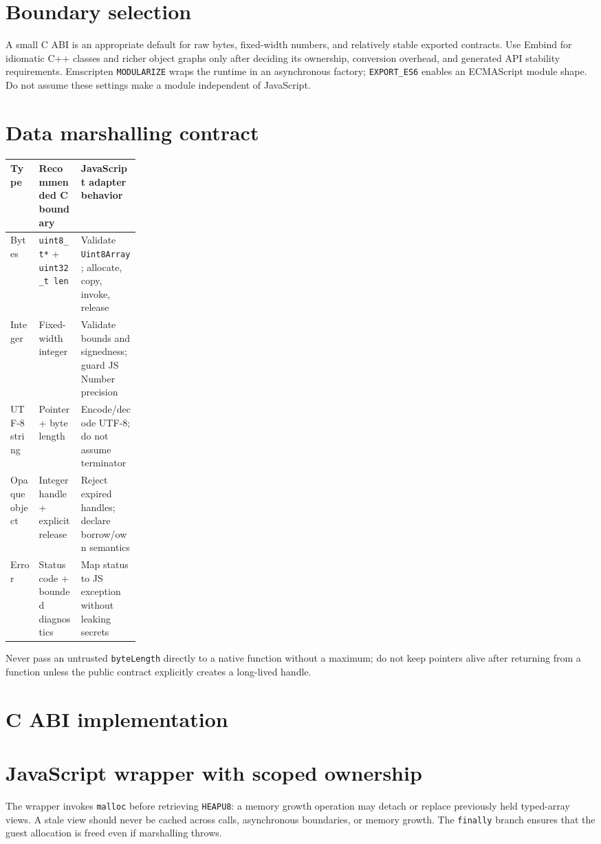 \documentclass[11pt,letterpaper]{article}
\begin{document}
\frontmatterdoc
\section{Boundary selection}
A small C ABI is an appropriate default for raw bytes, fixed-width numbers, and relatively stable exported contracts. Use Embind for idiomatic C++ classes and richer object graphs only after deciding its ownership, conversion overhead, and generated API stability requirements. Emscripten \texttt{MODULARIZE} wraps the runtime in an asynchronous factory; \texttt{EXPORT\_ES6} enables an ECMAScript module shape. Do not assume these settings make a module independent of JavaScript.

\section{Data marshalling contract}
\noindent\begin{tabularx}{\linewidth}{p{0.22\linewidth}X X}
\toprule Type & Recommended C boundary & JavaScript adapter behavior \\ \midrule
Bytes & \texttt{uint8\_t*} + \texttt{uint32\_t len} & Validate \texttt{Uint8Array}; allocate, copy, invoke, release \\
Integer & Fixed-width integer & Validate bounds and signedness; guard JS Number precision \\
UTF-8 string & Pointer + byte length & Encode/decode UTF-8; do not assume terminator \\
Opaque object & Integer handle + explicit release & Reject expired handles; declare borrow/own semantics \\
Error & Status code + bounded diagnostics & Map status to JS exception without leaking secrets \\
\bottomrule
\end{tabularx}
Never pass an untrusted \texttt{byteLength} directly to a native function without a maximum; do not keep pointers alive after returning from a function unless the public contract explicitly creates a long-lived handle.

\section{C ABI implementation}


\section{JavaScript wrapper with scoped ownership}

The wrapper invokes \texttt{malloc} before retrieving \texttt{HEAPU8}: a memory growth operation may detach or replace previously held typed-array views. A stale view should never be cached across calls, asynchronous boundaries, or memory growth. The \texttt{finally} branch ensures that the guest allocation is freed even if marshalling throws.
\end{document}
